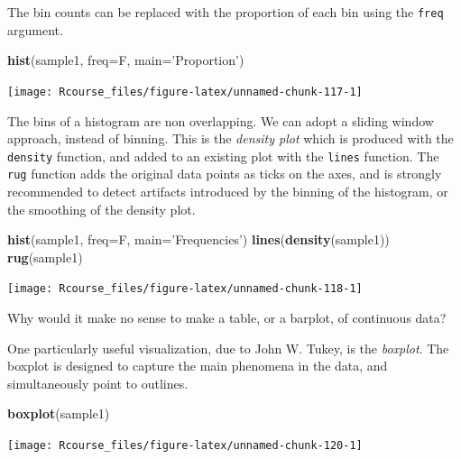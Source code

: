 \documentclass[]{book}
\newenvironment{Shaded}{\begin{snugshade}}{\end{snugshade}}
\newcommand{\KeywordTok}[1]{\textcolor[rgb]{0.13,0.29,0.53}{\textbf{#1}}}
\newcommand{\DataTypeTok}[1]{\textcolor[rgb]{0.13,0.29,0.53}{#1}}
\newcommand{\StringTok}[1]{\textcolor[rgb]{0.31,0.60,0.02}{#1}}
\newcommand{\NormalTok}[1]{#1}
\theoremstyle{definition}
\theoremstyle{definition}
\theoremstyle{definition}
\theoremstyle{remark}
\let\BeginKnitrBlock\begin \let\EndKnitrBlock\end
\begin{document}
The bin counts can be replaced with the proportion of each bin using the
\texttt{freq} argument.

\begin{Shaded}
\begin{Highlighting}[]
\KeywordTok{hist}\NormalTok{(sample1, }\DataTypeTok{freq=}\NormalTok{F, }\DataTypeTok{main=}\StringTok{'Proportion'}\NormalTok{)    }
\end{Highlighting}
\end{Shaded}

\texttt{[image: Rcourse\_files/figure-latex/unnamed-chunk-117-1]}

The bins of a histogram are non overlapping. We can adopt a sliding
window approach, instead of binning. This is the \emph{density plot}
which is produced with the \texttt{density} function, and added to an
existing plot with the \texttt{lines} function. The \texttt{rug}
function adds the original data points as ticks on the axes, and is
strongly recommended to detect artifacts introduced by the binning of
the histogram, or the smoothing of the density plot.

\begin{Shaded}
\begin{Highlighting}[]
\KeywordTok{hist}\NormalTok{(sample1, }\DataTypeTok{freq=}\NormalTok{F, }\DataTypeTok{main=}\StringTok{'Frequencies'}\NormalTok{)   }
\KeywordTok{lines}\NormalTok{(}\KeywordTok{density}\NormalTok{(sample1))                     }
\KeywordTok{rug}\NormalTok{(sample1)}
\end{Highlighting}
\end{Shaded}

\texttt{[image: Rcourse\_files/figure-latex/unnamed-chunk-118-1]}

\BeginKnitrBlock{remark}
{}Why would it make no sense to make a table,
or a barplot, of continuous data?
\EndKnitrBlock{remark}

One particularly useful visualization, due to John W. Tukey, is the
\emph{boxplot}. The boxplot is designed to capture the main phenomena in
the data, and simultaneously point to outlines.

\begin{Shaded}
\begin{Highlighting}[]
\KeywordTok{boxplot}\NormalTok{(sample1)    }
\end{Highlighting}
\end{Shaded}

\texttt{[image: Rcourse\_files/figure-latex/unnamed-chunk-120-1]}
\end{document}

